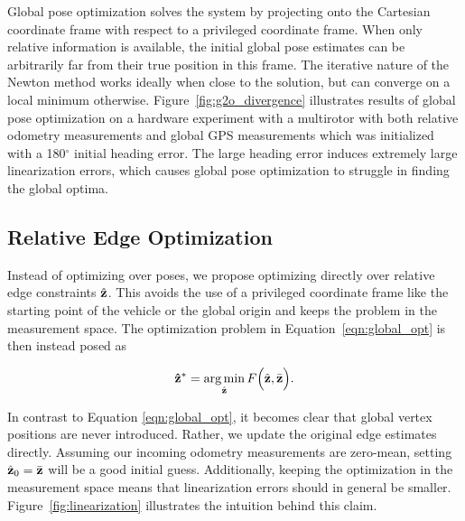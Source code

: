Global pose optimization solves the system by projecting onto the Cartesian coordinate frame with respect to a privileged coordinate frame. When only relative information is available, the initial global pose estimates can be arbitrarily far from their true position in this frame. The iterative nature of the Newton method works ideally when close to the solution, but can converge on a local minimum otherwise.  Figure~\ref{fig:g2o_divergence} illustrates results of global pose optimization on a hardware experiment with a multirotor with both relative odometry measurements and global GPS measurements which was initialized with a 180$^\circ$ initial heading error.  The large heading error induces extremely large linearization errors, which causes global pose optimization to struggle in finding the global optima.



\subsection{Relative Edge Optimization}
Instead of optimizing over poses, we propose optimizing directly over relative edge constraints $\hat{\mathbf{z}}$.  This avoids the use of a privileged coordinate frame like the starting point of the vehicle or the global origin and keeps the problem in the measurement space.  The optimization problem in Equation~\ref{eqn:global_opt} is then instead posed as

\begin{align}
  \mathbf{\hat{\mathbf{z}}}^* = \operatorname*{arg\,min}_{\hat{\mathbf{z}}} F\Big(\hat{\mathbf{z}},\bar{\mathbf{z}} \Big).
  \label{eqn:relative_opt}
\end{align}

In contrast to Equation \ref*{eqn:global_opt}, it becomes clear that global vertex positions are never introduced. Rather, we update the original edge estimates directly. Assuming our incoming odometry measurements are zero-mean, setting $\hat{\mathbf{z}}_0 = \bar{\mathbf{z}}$ will be a good initial guess.  Additionally, keeping the optimization in the measurement space means that linearization errors should in general be smaller.  Figure~\ref{fig:linearization} illustrates the intuition behind this claim.

